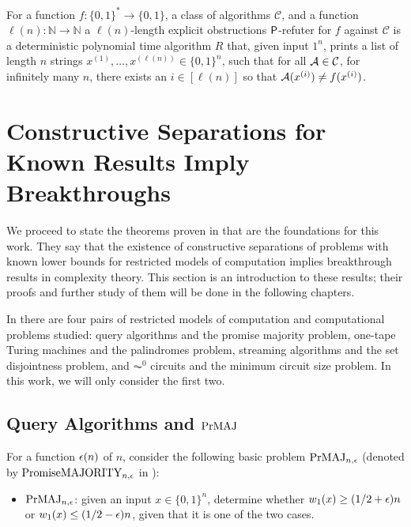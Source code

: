 \begin{definition}
	For a function $f \colon \{0, 1\}^* \to \{0, 1\}$, a class of algorithms $\mathcal{C}$,
	and a function $\ell(n) \colon \mathbb{N} \to \mathbb{N}$ 
	a $\ell(n)$-length explicit obstructions $\mathsf{P}$-refuter for $f$ against $\mathcal{C}$ is a deterministic polynomial time
	algorithm $R$ that, given input $1^n$, prints a list of length $n$ strings
	$x^{(1)}, \ldots, x^{(\ell(n))} \in \{0, 1\}^n$,
	such that for all $\mathcal{A} \in \mathcal{C}$, for infinitely many $n$, there exists an $i \in [\ell(n)]$ so that 
	$\mathcal{A}(x^{(i)}) \neq f(x^{(i)})$.
\end{definition}



\section{Constructive Separations for Known Results Imply Breakthroughs}

We proceed to state the 
theorems proven in \cite{ConstructiveSeparations} that are the foundations 
for this work. They say that the existence of constructive separations of problems 
with known lower bounds for restricted models of computation implies breakthrough results in complexity theory. 
This section is an introduction to these results; their proofs and further study of them will be 
done in the following chapters. 

In \cite{ConstructiveSeparations} there are four pairs of restricted models of computation
and computational problems studied: query algorithms and the promise majority problem,
one-tape Turing machines and the palindromes problem, streaming algorithms and the set disjointness problem,
and $\AC^0$ circuits and the minimum circuit size problem. In this work, we will only consider the first two. 

\subsection{Query Algorithms and $\mathrm{PrMAJ}$}

For a function $\epsilon(n)$ of $n$, consider the following basic problem $\mathrm{PrMAJ}_{n, \epsilon}$ (denoted 
by $\textrm{PromiseMAJORITY}_{n, \epsilon}$ in \cite{ConstructiveSeparations}):

\begin{itemize}
	\item[] $\mathrm{PrMAJ}_{n, \epsilon}$: given an input $x \in \{0, 1\}^n$, determine whether $w_1(x) \geq (1/2+\epsilon)n$
	or $w_1(x) \leq (1/2-\epsilon)n$, given that it is one of the two cases. 
\end{itemize}

